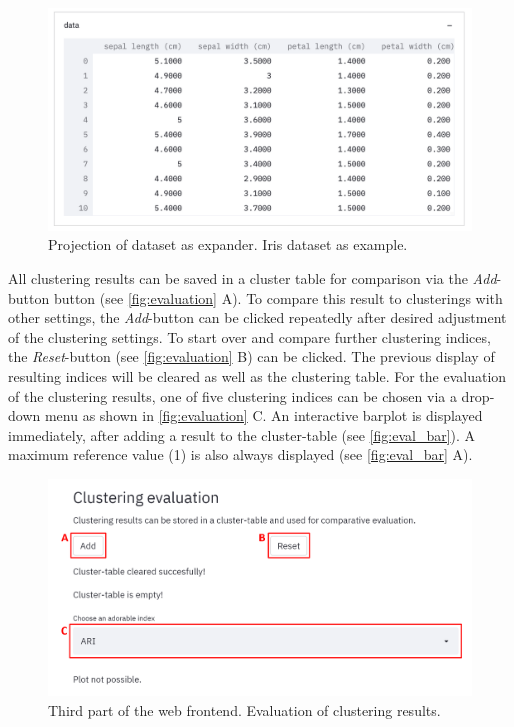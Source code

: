 \begin{figure}[H]
	\centering
	\includegraphics[width=\linewidth]{modules/web_frontend/data_info_pca.png}
	\caption{Projection of dataset as expander. Iris dataset as example.}\label{fig:data_info_pca}
\end{figure}

All clustering results can be saved in a cluster table for comparison via the \textit{Add}-button button (see \autoref{fig:evaluation} A). To compare this result to clusterings with other settings, the \textit{Add}-button can be clicked repeatedly after desired adjustment of the clustering settings. To start over and compare further clustering indices, the \textit{Reset}-button (see \autoref{fig:evaluation} B) can be clicked. The previous display of resulting indices will be cleared as well as the clustering table.
For the evaluation of the clustering results, one of five clustering indices can be chosen via a drop-down menu as shown in \autoref{fig:evaluation} C. An interactive barplot is displayed immediately, after adding a result to the cluster-table (see \autoref{fig:eval_bar}). A maximum reference value (1) is also always displayed (see \autoref{fig:eval_bar} A).
\begin{figure}[H]
	\centering
	\includegraphics[width=\linewidth]{modules/web_frontend/evaluation_letters}
	\caption{Third part of the web frontend. Evaluation of clustering results.}\label{fig:evaluation}
\end{figure}

